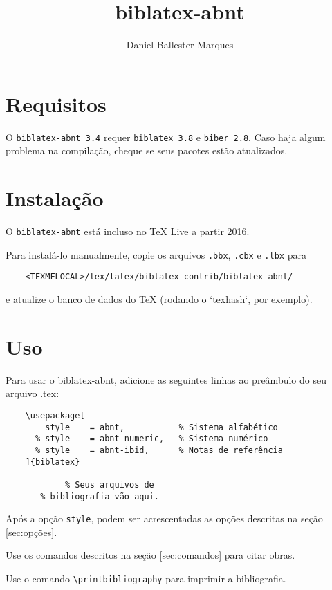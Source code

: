 \documentclass[a4paper]{article}
\title{biblatex-abnt \version}
\author{Daniel Ballester Marques}
\newcommand{\version}{3.4}
\newcommand{\requirements}{\texttt{biblatex 3.8} e \texttt{biber 2.8}}
\begin{document}

\maketitle

\tableofcontents

\clearpage
\section{Requisitos}%

O \texttt{biblatex-abnt \version} requer \requirements. Caso haja algum
problema na compilação, cheque se seus pacotes estão atualizados.

\section{Instalação}%

O \texttt{biblatex-abnt} está incluso no TeX Live a partir 2016.

Para instalá-lo manualmente, copie os arquivos \texttt{.bbx}, \texttt{.cbx} e
\texttt{.lbx} para
\begin{verbatim}
    <TEXMFLOCAL>/tex/latex/biblatex-contrib/biblatex-abnt/
\end{verbatim}
e atualize o banco de dados do TeX (rodando o `texhash`, por exemplo).

\section{Uso}%

Para usar o {biblatex-abnt}, adicione as seguintes linhas ao preâmbulo do seu
arquivo {.tex}:

\begin{verbatim}
    \usepackage[
        style    = abnt,           % Sistema alfabético
      % style    = abnt-numeric,   % Sistema numérico
      % style    = abnt-ibid,      % Notas de referência
    ]{biblatex}

            % Seus arquivos de
       % bibliografia vão aqui.
\end{verbatim}

Após a opção \texttt{style}, podem ser acrescentadas
as opções descritas na seção \ref{sec:opções}.

Use os comandos descritos na seção \ref{sec:comandos} para citar obras.

Use o comando \verb"\printbibliography" para imprimir a bibliografia.
\end{document}
